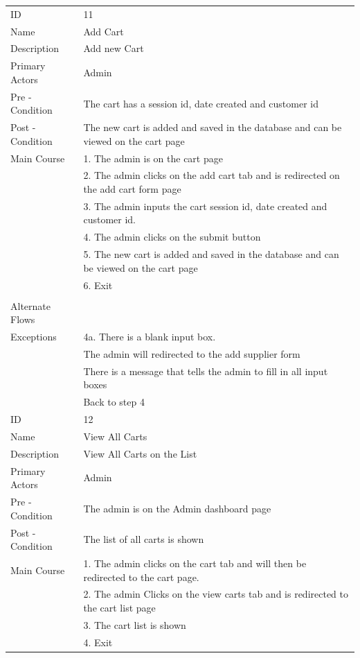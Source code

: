 \documentclass{report}
\begin{document}
\begin{tabular}{ l l }
ID 					& 11 \\
Name 				& Add Cart \\
Description 			& Add new Cart \\ 
Primary Actors 		& Admin \\
Pre - Condition 		& The cart has a session id, date created and customer id \\ 
Post - Condition 	& The new cart is added and saved in the database and can be viewed on the cart page \\ 
Main Course			& 1. The admin is on the cart page \\
					& 2. The admin clicks on the add cart tab and is redirected on the add cart form page \\
					& 3. The admin inputs the cart session id, date created and customer id. \\
					& 4. The admin clicks on the submit button \\
					& 5. The new cart is added and saved in the database and can be viewed on the cart page \\
					& 6. Exit \\ \\
Alternate Flows		& \\
Exceptions 			& 4a. There is a blank input box. \\
					& \qquad 1.1 	The admin will redirected to the add supplier form \\
					& \qquad 1.2 	There is a message that tells the admin to fill in all input boxes\\
					& \qquad 1.3 	Back to step 4 \\
ID 					& 12 \\
Name 				& View All Carts \\
Description 			& View All Carts on the List \\ 
Primary Actors 		& Admin \\
Pre - Condition 		& The admin is on the Admin dashboard page \\ 
Post - Condition 	& The list of all carts is shown \\ 
Main Course			& 1. The admin clicks on the cart tab and will then be redirected to the  cart page. \\
					& 2. The admin Clicks on the view carts tab and is redirected to the cart list page \\
					& 3. The cart list is shown \\
					& 4. Exit \\

\end{tabular}
\end{document}
